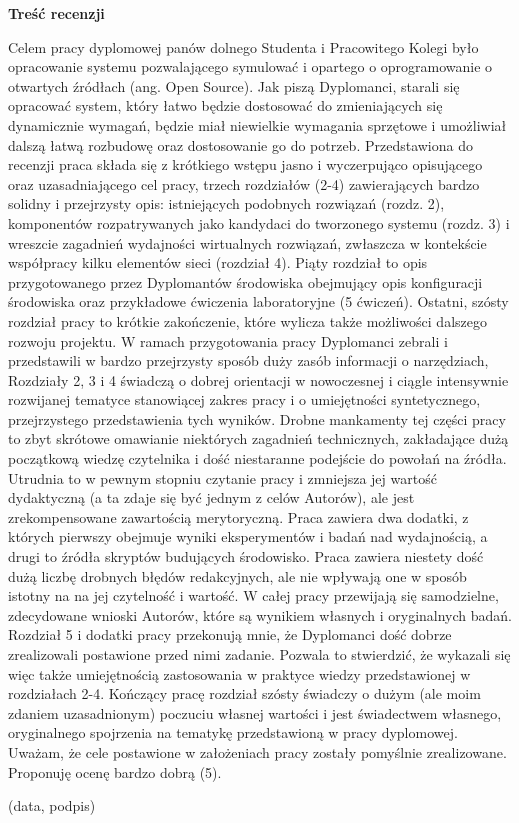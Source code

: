 \centerline{\bf Treść recenzji}
   Celem pracy dyplomowej panów dolnego Studenta i Pracowitego Kolegi  było
opracowanie systemu pozwalającego symulować  i opartego o oprogramowanie o
otwartych źródłach (ang. Open Source). Jak piszą Dyplomanci, starali się opracować
system, który łatwo będzie dostosować do zmieniających się dynamicznie wymagań,
będzie miał niewielkie wymagania sprzętowe i umożliwiał dalszą łatwą rozbudowę oraz
dostosowanie go do potrzeb.
Przedstawiona do recenzji praca składa się z krótkiego wstępu jasno i
wyczerpująco opisującego oraz uzasadniającego cel pracy, trzech rozdziałów (2-4)
zawierających bardzo solidny i przejrzysty opis: istniejących podobnych
rozwiązań (rozdz. 2), komponentów rozpatrywanych jako kandydaci do
tworzonego systemu (rozdz. 3) i wreszcie zagadnień wydajności wirtualnych
rozwiązań, zwłaszcza w kontekście współpracy  kilku elementów
 sieci (rozdział 4). Piąty rozdział to opis przygotowanego przez
Dyplomantów środowiska obejmujący opis konfiguracji
środowiska oraz przykładowe ćwiczenia laboratoryjne (5 ćwiczeń). Ostatni, szósty
rozdział pracy to krótkie zakończenie, które wylicza także możliwości dalszego
rozwoju projektu. W ramach przygotowania pracy Dyplomanci zebrali i przedstawili w
bardzo przejrzysty sposób duży zasób informacji o narzędziach, Rozdziały 2, 3 i 4 świadczą o dobrej orientacji
w nowoczesnej i ciągle intensywnie rozwijanej tematyce stanowiącej
zakres pracy i o umiejętności syntetycznego, przejrzystego przedstawienia tych
wyników. Drobne  mankamenty tej części pracy to zbyt skrótowe omawianie
niektórych zagadnień technicznych, zakładające dużą początkową wiedzę czytelnika
i dość niestaranne podejście do powołań na źródła.
Utrudnia to w pewnym stopniu czytanie pracy i zmniejsza jej wartość dydaktyczną
(a ta zdaje się być jednym z celów Autorów), ale jest zrekompensowane zawartością
merytoryczną. Praca zawiera dwa dodatki, z których pierwszy obejmuje wyniki
eksperymentów i badań nad wydajnością, a drugi to źródła
skryptów budujących środowisko. Praca
zawiera niestety dość dużą liczbę drobnych błędów redakcyjnych, ale nie wpływają
one w sposób istotny na na jej czytelność i wartość. W całej pracy przewijają
się samodzielne, zdecydowane wnioski Autorów, które są wynikiem własnych i
oryginalnych badań.  Rozdział 5 i dodatki pracy przekonują mnie, że Dyplomanci dość
dobrze zrealizowali postawione przed nimi zadanie. Pozwala to stwierdzić, że
wykazali się więc także umiejętnością zastosowania w praktyce wiedzy
przedstawionej w rozdziałach 2-4. Kończący pracę rozdział szósty świadczy o
dużym (ale moim zdaniem uzasadnionym) poczuciu własnej wartości i jest
świadectwem własnego, oryginalnego spojrzenia na tematykę przedstawioną w pracy
dyplomowej. Uważam, że cele postawione w założeniach pracy zostały pomyślnie
zrealizowane. Proponuję ocenę bardzo dobrą (5).

\vskip 1cm
{
\raggedleft
(data, podpis)\kern1cm

}